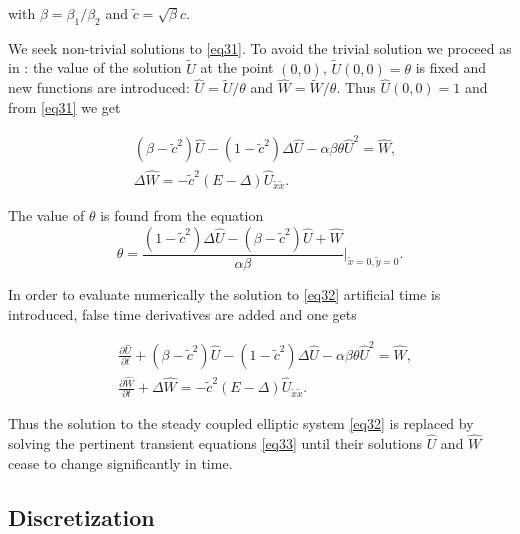 \documentclass[12pt]{article}
\theoremstyle{theorem}
\theoremstyle{defi}
\begin{document}
with $\beta = \beta_1 / \beta_2$ and $ \tilde c = \sqrt {\beta} c$.

We seek  non-trivial solutions to \eqref{eq31}. To avoid the trivial solution we proceed as in \cite{ref6}: the value of the solution $\tilde U$ at the point $(0,0)$,  $\tilde U(0,0)=\theta $ is fixed and new  functions are introduced: $\widehat{U}=\tilde U /{\theta} $ and $\widehat{W}=\tilde W /{\theta} $. Thus  
$ \widehat{U}(0,0)=1$ and from \eqref{eq31} we get

\begin{equation}\label{eq32}
\begin{split}
& (\beta-\tilde c^2) \widehat{U}  -(1-\tilde c^2) \Delta \widehat{U} - \alpha \beta \theta \widehat{U}^2 = \widehat{W}, \\
&\Delta \widehat{W} = - \tilde c^2 (E- \Delta) \widehat{U}_{\tilde x \tilde x}.
\end{split}
\end{equation}

The value of $\theta $ is found from the  equation 
\begin{equation}\label{eqtheta}
\theta = \frac{ (1-\tilde c^2 )\Delta \widehat{U} - (\beta-\tilde c^2) \widehat{U} +\widehat{W}}{\alpha \beta} |_{\tilde x=0,\tilde y=0} .
\end{equation}

In order to evaluate numerically the solution to \eqref{eq32} artificial time is introduced, false time derivatives are added and one gets

\begin{equation}\label{eq33}
\begin{split}
&\frac {\partial \widehat{U}}{\partial t} + (\beta-\tilde c^2) \widehat{U} - (1-\tilde c^2 ) \Delta \widehat{U} - \alpha \beta \theta \widehat{U}^2 = \widehat{W}, \\
&\frac {\partial \widehat{W}}{\partial t} + \Delta \widehat{W} = - \tilde c^2 (E- \Delta) \widehat{U}_{\tilde x \tilde x}. 
\end{split}
\end{equation}

Thus the solution to the steady coupled elliptic system \eqref{eq32} is replaced by solving the pertinent transient equations \eqref{eq33} until their solutions $\widehat{U}$ and $\widehat{W}$ cease to change significantly in time. 

\subsection{Discretization}
\end{document}
